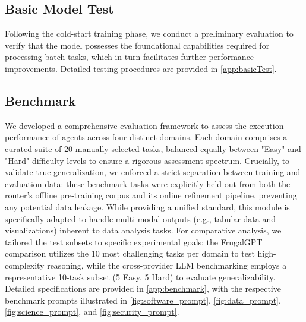 \documentclass{article}
\theoremstyle{plain}
\theoremstyle{definition}
\theoremstyle{remark}
\begin{document}
\subsection{Basic Model Test}

Following the cold-start training phase, we conduct a preliminary evaluation to verify that the model possesses the foundational capabilities required for processing batch tasks, which in turn facilitates further performance improvements. Detailed testing procedures are provided in \cref{app:basicTest}.

\subsection{Benchmark}

We developed a comprehensive evaluation framework \cite{zheng2023judging,liu2023g} to assess the execution performance of agents across four distinct domains. Each domain comprises a curated suite of 20 manually selected tasks, balanced equally between "Easy" and "Hard" difficulty levels to ensure a rigorous assessment spectrum. Crucially, to validate true generalization, we enforced a strict separation between training and evaluation data: these benchmark tasks were explicitly held out from both the router's offline pre-training corpus and its online refinement pipeline, preventing any potential data leakage. While providing a unified standard, this module is specifically adapted to handle multi-modal outputs (e.g., tabular data and visualizations) inherent to data analysis tasks. For comparative analysis, we tailored the test subsets to specific experimental goals: the FrugalGPT comparison utilizes the 10 most challenging tasks per domain to test high-complexity reasoning, while the cross-provider LLM benchmarking employs a representative 10-task subset (5 Easy, 5 Hard) to evaluate generalizability. Detailed specifications are provided in \cref{app:benchmark}, with the respective benchmark prompts illustrated in \cref{fig:software_prompt}, \cref{fig:data_prompt}, \cref{fig:science_prompt}, and \cref{fig:security_prompt}.
\end{document}
